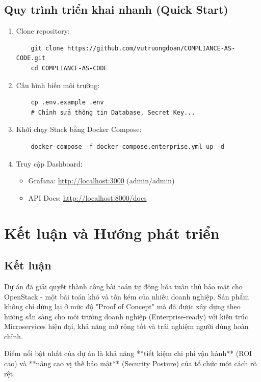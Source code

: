 \documentclass[12pt,a4paper]{report}
\begin{document}
\section{Quy trình triển khai nhanh (Quick Start)}
\begin{enumerate}
    \item Clone repository:
    \begin{verbatim}
    git clone https://github.com/vutruongdoan/COMPLIANCE-AS-CODE.git
    cd COMPLIANCE-AS-CODE
    \end{verbatim}
    
    \item Cấu hình biến môi trường:
    \begin{verbatim}
    cp .env.example .env
    # Chỉnh sửa thông tin Database, Secret Key...
    \end{verbatim}
    
    \item Khởi chạy Stack bằng Docker Compose:
    \begin{verbatim}
    docker-compose -f docker-compose.enterprise.yml up -d
    \end{verbatim}
    
    \item Truy cập Dashboard:
    \begin{itemize}
        \item Grafana: \url{http://localhost:3000} (admin/admin)
        \item API Docs: \url{http://localhost:8000/docs}
    \end{itemize}
\end{enumerate}

\chapter{Kết luận và Hướng phát triển}

\section{Kết luận}
Dự án đã giải quyết thành công bài toán tự động hóa tuân thủ bảo mật cho OpenStack - một bài toán khó và tốn kém của nhiều doanh nghiệp. Sản phẩm không chỉ dừng lại ở mức độ "Proof of Concept" mà đã được xây dựng theo hướng sẵn sàng cho môi trường doanh nghiệp (Enterprise-ready) với kiến trúc Microservices hiện đại, khả năng mở rộng tốt và trải nghiệm người dùng hoàn chỉnh.

Điểm nổi bật nhất của dự án là khả năng **tiết kiệm chi phí vận hành** (ROI cao) và **nâng cao vị thế bảo mật** (Security Posture) của tổ chức một cách rõ rệt.
\end{document}
